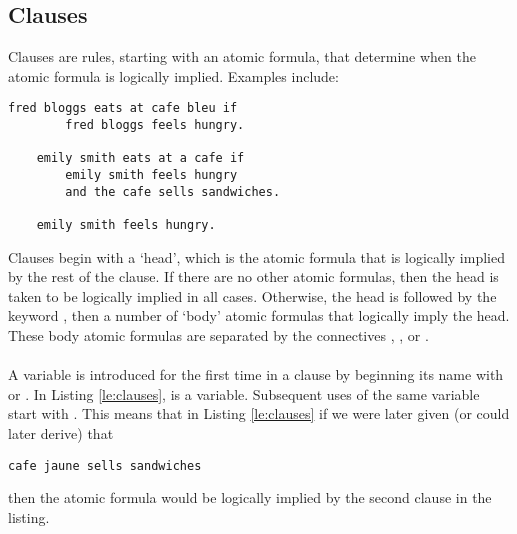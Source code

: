 \documentclass[../main.tex]{subfiles}
\begin{document}
\subsection{Clauses}
Clauses are rules, starting with an atomic formula, that determine when the atomic formula is logically implied. Examples include:
\newpage
\begin{lstlisting}[language={LE},label={le:clauses},caption={Examples of clauses in Logical English.}]
    fred bloggs eats at cafe bleu if
        fred bloggs feels hungry.

    emily smith eats at a cafe if
        emily smith feels hungry
        and the cafe sells sandwiches.

    emily smith feels hungry.
\end{lstlisting}
Clauses begin with a `head', which is the atomic formula that is logically implied by the rest of the clause. If there are no other atomic formulas, then the head is taken to be logically implied in all cases. Otherwise, the head is followed by the keyword , then a number of `body' atomic formulas that logically imply the head. These body atomic formulas are separated by the connectives , , or .
\\
\\
A variable is introduced for the first time in a clause by beginning its name with  or . In Listing \ref{le:clauses},  is a variable. Subsequent uses of the same variable start with . This means that in Listing \ref{le:clauses} if we were later given (or could later derive) that
\begin{lstlisting}[language={LE}]
    cafe jaune sells sandwiches
\end{lstlisting}
then the atomic formula  would be logically implied by the second clause in the listing. 
\end{document}
